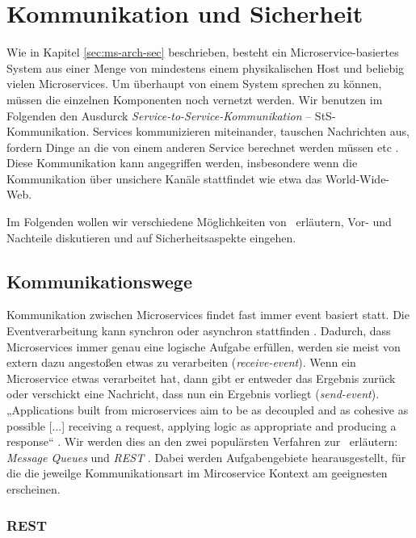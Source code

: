 \section{Kommunikation und Sicherheit}

Wie in Kapitel \ref{sec:ms-arch-sec} beschrieben, besteht ein Microservice-basiertes System aus einer Menge von mindestens einem physikalischen Host und beliebig vielen Microservices. Um überhaupt von einem System sprechen zu können, müssen die einzelnen Komponenten noch vernetzt werden. Wir benutzen im Folgenden den Ausdurck \textit{Service-to-Service-Kommunikation} -- StS-Kommunikation. Services kommunizieren miteinander, tauschen Nachrichten aus, fordern Dinge an die von einem anderen Service berechnet werden müssen etc \cite{newman2015}. Diese Kommunikation kann angegriffen werden, insbesondere wenn die Kommunikation über unsichere Kanäle stattfindet wie etwa das World-Wide-Web.

Im Folgenden wollen wir verschiedene Möglichkeiten von \stscom\ erläutern, Vor- und Nachteile diskutieren und auf Sicherheitsaspekte eingehen.

\subsection{Kommunikationswege}

Kommunikation zwischen Microservices findet fast immer event basiert statt. Die Eventverarbeitung kann synchron oder asynchron stattfinden \cite{newman2015}. Dadurch, dass Microservices immer genau eine logische Aufgabe erfüllen, werden sie meist von extern dazu angestoßen etwas zu verarbeiten (\textit{receive-event}). Wenn ein Microservice etwas verarbeitet hat, dann gibt er entweder das Ergebnis zurück oder verschickt eine Nachricht, dass nun ein Ergebnis vorliegt (\textit{send-event}). „Applications built from microservices aim to be as decoupled and as cohesive as possible [...] receiving a request, applying logic as appropriate and producing a response“ \cite{Fowler+14}. Wir werden dies an den zwei populärsten Verfahren zur \stscom\ erläutern: \textit{Message Queues} und \textit{REST} \cite{Fowler+14,newman2015}. Dabei werden Aufgabengebiete hearausgestellt, für die die jeweilge Kommunikationsart im Mircoservice Kontext am geeignesten erscheinen.

\subsubsection{REST}

